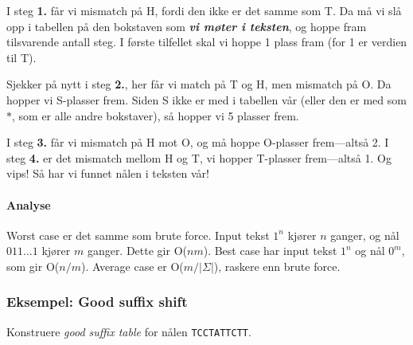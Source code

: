 \documentclass[11pt,a4paper]{article}
\theoremstyle{def}
\begin{document}

I steg \textbf{1.} får vi mismatch på H, fordi den ikke er det samme som T. Da må vi slå opp i tabellen på den bokstaven som \textbf{\textit{vi møter i teksten}}, og hoppe fram tilsvarende antall steg. I første tilfellet skal vi hoppe 1 plass fram (for 1 er verdien til T). 

Sjekker på nytt i steg \textbf{2.}, her får vi match på T og H, men mismatch på O. Da hopper vi S-plasser frem. Siden S ikke er med i tabellen vår (eller den er med som $*$, som er alle andre bokstaver), så hopper vi 5 plasser frem.

I steg \textbf{3.} får vi mismatch på H mot O, og må hoppe O-plasser frem---altså 2. I steg \textbf{4.} er det mismatch mellom H og T, vi hopper T-plasser frem---altså 1. Og vips! Så har vi funnet nålen i teksten vår!

\paragraph{Analyse}
Worst case er det samme som brute force. Input tekst $1^n$ kjører $n$ ganger, og nål $011\dots1$ kjører $m$ ganger. Dette gir O($nm$). Best case har input tekst $1^n$ og nål $0^m$, som gir O($n/m$). Average case er O($m/|\Sigma|$), raskere enn brute force.


\subsubsection{Eksempel: Good suffix shift}
Konstruere \textit{good suffix table} for nålen \texttt{TCCTATTCTT}.
\end{document}
